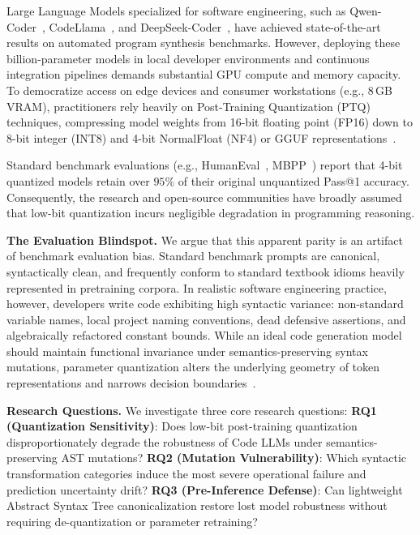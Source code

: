 \documentclass[11pt,twocolumn]{article}
\begin{document}
Large Language Models specialized for software engineering, such as Qwen-Coder~\cite{hui2024qwen2}, CodeLlama~\cite{roziere2023code}, and DeepSeek-Coder~\cite{guo2024deepseek}, have achieved state-of-the-art results on automated program synthesis benchmarks. However, deploying these billion-parameter models in local developer environments and continuous integration pipelines demands substantial GPU compute and memory capacity. To democratize access on edge devices and consumer workstations (e.g., 8\,GB VRAM), practitioners rely heavily on Post-Training Quantization (PTQ) techniques, compressing model weights from 16-bit floating point (FP16) down to 8-bit integer (INT8) and 4-bit NormalFloat (NF4) or GGUF representations~\cite{dettmers2022llm, dettmers2023qlora, frantar2022gptq}.

Standard benchmark evaluations (e.g., HumanEval~\cite{chen2021evaluating}, MBPP~\cite{austin2021program}) report that 4-bit quantized models retain over $95\%$ of their original unquantized Pass@1 accuracy. Consequently, the research and open-source communities have broadly assumed that low-bit quantization incurs negligible degradation in programming reasoning.

\noindent\textbf{The Evaluation Blindspot.} We argue that this apparent parity is an artifact of benchmark evaluation bias. Standard benchmark prompts are canonical, syntactically clean, and frequently conform to standard textbook idioms heavily represented in pretraining corpora. In realistic software engineering practice, however, developers write code exhibiting high syntactic variance: non-standard variable names, local project naming conventions, dead defensive assertions, and algebraically refactored constant bounds. While an ideal code generation model should maintain functional invariance under semantics-preserving syntax mutations, parameter quantization alters the underlying geometry of token representations and narrows decision boundaries~\cite{lin2023awq}.

\noindent\textbf{Research Questions.} We investigate three core research questions:
\textbf{RQ1 (Quantization Sensitivity)}: Does low-bit post-training quantization disproportionately degrade the robustness of Code LLMs under semantics-preserving AST mutations?
\textbf{RQ2 (Mutation Vulnerability)}: Which syntactic transformation categories induce the most severe operational failure and prediction uncertainty drift?
\textbf{RQ3 (Pre-Inference Defense)}: Can lightweight Abstract Syntax Tree canonicalization restore lost model robustness without requiring de-quantization or parameter retraining?
\end{document}
